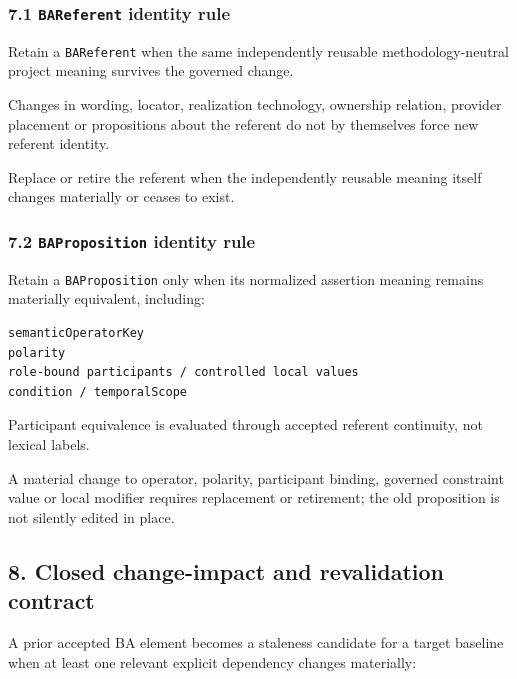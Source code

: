 \documentclass[11pt,a4paper]{article}
\begin{document}
\subsubsection{\texorpdfstring{7.1 \texttt{BAReferent} identity rule}{7.1 BAReferent identity rule}}\label{bareferent-identity-rule}

Retain a \texttt{BAReferent} when the same independently reusable methodology-neutral project meaning survives the governed change.

Changes in wording, locator, realization technology, ownership relation, provider placement or propositions about the referent do not by themselves force new referent identity.

Replace or retire the referent when the independently reusable meaning itself changes materially or ceases to exist.

\subsubsection{\texorpdfstring{7.2 \texttt{BAProposition} identity rule}{7.2 BAProposition identity rule}}\label{baproposition-identity-rule}

Retain a \texttt{BAProposition} only when its normalized assertion meaning remains materially equivalent, including:

\begin{verbatim}
semanticOperatorKey
polarity
role-bound participants / controlled local values
condition / temporalScope
\end{verbatim}

Participant equivalence is evaluated through accepted referent continuity, not lexical labels.

A material change to operator, polarity, participant binding, governed constraint value or local modifier requires replacement or retirement; the old proposition is not silently edited in place.

\subsection{8. Closed change-impact and revalidation contract}\label{closed-change-impact-and-revalidation-contract}

A prior accepted BA element becomes a staleness candidate for a target baseline when at least one relevant explicit dependency changes materially:
\end{document}
